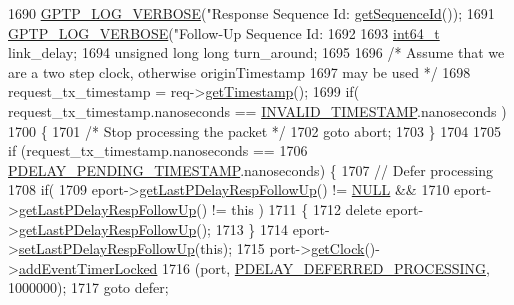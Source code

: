 \begin{DoxyCode}
{{{{{{1690     \hyperlink{gptp__log_8hpp_add03384a2a8099b27e07d041cce77e6f}{GPTP\_LOG\_VERBOSE}(\textcolor{stringliteral}{"Response Sequence Id: %
      \hyperlink{class_p_t_p_message_common_abd5cac5701120cbbfc56129b31fa801f}{getSequenceId}());
1691     \hyperlink{gptp__log_8hpp_add03384a2a8099b27e07d041cce77e6f}{GPTP\_LOG\_VERBOSE}(\textcolor{stringliteral}{"Follow-Up Sequence Id: %
1692 
1693     \hyperlink{parse_8c_a67a9885ef4908cb72ce26d75b694386c}{int64\_t} link\_delay;
1694     \textcolor{keywordtype}{unsigned} \textcolor{keywordtype}{long} \textcolor{keywordtype}{long} turn\_around;
1695 
1696     \textcolor{comment}{/* Assume that we are a two step clock, otherwise originTimestamp}
1697 \textcolor{comment}{       may be used */}
1698     request\_tx\_timestamp = req->\hyperlink{class_p_t_p_message_common_a0bdaf174c565b4d10499011885dde906}{getTimestamp}();
1699     \textcolor{keywordflow}{if}( request\_tx\_timestamp.nanoseconds == \hyperlink{ieee1588_8hpp_a2a0a650d16403da1f447b7543ce68e2b}{INVALID\_TIMESTAMP}.nanoseconds )
1700     \{
1701         \textcolor{comment}{/* Stop processing the packet */}
1702         \textcolor{keywordflow}{goto} abort;
1703     \}
1704 
1705     \textcolor{keywordflow}{if} (request\_tx\_timestamp.nanoseconds ==
1706         \hyperlink{ieee1588_8hpp_ac581f400733550b025ec8d37435f35bc}{PDELAY\_PENDING\_TIMESTAMP}.nanoseconds) \{
1707         \textcolor{comment}{// Defer processing}
1708         \textcolor{keywordflow}{if}(
1709             eport->\hyperlink{class_ether_port_ae72309bd695c8d5041590b9f030ec8d7}{getLastPDelayRespFollowUp}() != \hyperlink{openavb__types__base__pub_8h_a070d2ce7b6bb7e5c05602aa8c308d0c4}{NULL} &&
1710             eport->\hyperlink{class_ether_port_ae72309bd695c8d5041590b9f030ec8d7}{getLastPDelayRespFollowUp}() != this )
1711         \{
1712             \textcolor{keyword}{delete} eport->\hyperlink{class_ether_port_ae72309bd695c8d5041590b9f030ec8d7}{getLastPDelayRespFollowUp}();
1713         \}
1714         eport->\hyperlink{class_ether_port_a3fda8f9b8062143325749e9a76cd24e4}{setLastPDelayRespFollowUp}(\textcolor{keyword}{this});
1715         port->\hyperlink{class_common_port_ab8e59ecfb51ec14e166bc8bfc872b1ef}{getClock}()->\hyperlink{class_i_e_e_e1588_clock_a4747f09108bd78ecd68d58dad4358d77}{addEventTimerLocked}
1716             (port, \hyperlink{ieee1588_8hpp_a5667b805d857c6d28f83f6038a0272d3a24255144ef3565ed208dc524d12bbcd1}{PDELAY\_DEFERRED\_PROCESSING}, 1000000);
1717         \textcolor{keywordflow}{goto} defer;
}}}}}}}}
\end{DoxyCode}
